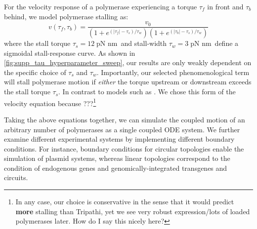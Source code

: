 \documentclass[11pt]{article}
\newcommand{\unit}[1]{\; \text{#1}\,}
\begin{document}
For the velocity response of a polymerase experiencing a torque \(\tau_f\) in front and \(\tau_b\) behind, we model polymerase stalling as:
\begin{equation}
    v(\tau_f, \tau_b) = \frac{v_0}{(1 + e^{(|\tau_f| - \tau_s)/\tau_w})(1 + e^{(|\tau_b| - \tau_s)/\tau_w})}
\label{eq:velocity_response}
\end{equation}
where the stall torque \(\tau_s = 12 \unit{pN nm}\) and stall-width \(\tau_w = 3 \unit{pN nm}\) define a sigmoidal stall-response curve.
As shown in \cref{fig:supp_tau_hyperparameter_sweep}, our results are only weakly dependent on the specific choice of \(\tau_s\) and \(\tau_w\).
Importantly, our selected phenomenological term will stall polymerase motion if \emph{either} the torque upstream or downstream exceeds the stall torque \(\tau_s\). In contrast to models such as \textcite{tripathiDNASupercoilingmediatedCollective2021}. We chose this form of the velocity equation because ???\footnote{In any case, our choice is conservative in the sense that it would predict \textbf{more} stalling than Tripathi, yet we see very robust expression/lots of loaded polymerases later. How do I say this nicely here?}


Taking the above equations together, we can simulate the coupled motion of an arbitrary number of polymerases as a single coupled ODE system. We further examine different experimental systems by implementing different boundary conditions. For instance, boundary conditions for circular topologies enable the simulation of plasmid systems, whereas linear topologies correspond to the condition of endogenous genes and genomically-integrated transgenes and circuits.
\end{document}
